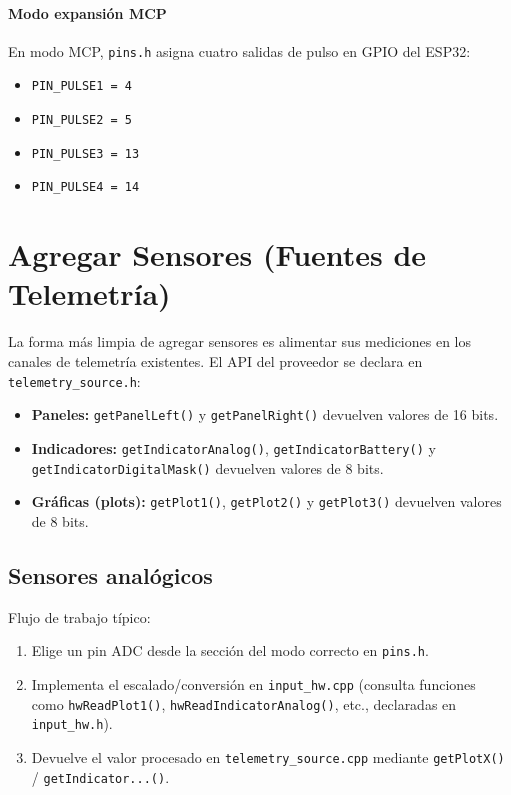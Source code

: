 \paragraph{Modo expansión MCP}
En modo MCP, \texttt{pins.h} asigna cuatro salidas de pulso en GPIO del ESP32:

\begin{itemize}
    \item \texttt{PIN\_PULSE1 = 4}
    \item \texttt{PIN\_PULSE2 = 5}
    \item \texttt{PIN\_PULSE3 = 13}
    \item \texttt{PIN\_PULSE4 = 14}
\end{itemize}

\section{Agregar Sensores (Fuentes de Telemetría)}

La forma más limpia de agregar sensores es alimentar sus mediciones en los canales de telemetría existentes. El API del proveedor
se declara en \texttt{telemetry\_source.h}:

\begin{itemize}
    \item \textbf{Paneles:} \verb|getPanelLeft()| y \verb|getPanelRight()| devuelven valores de 16 bits.
    \item \textbf{Indicadores:} \verb|getIndicatorAnalog()|, \verb|getIndicatorBattery()| y
    \verb|getIndicatorDigitalMask()| devuelven valores de 8 bits.
    \item \textbf{Gráficas (plots):} \verb|getPlot1()|, \verb|getPlot2()| y \verb|getPlot3()| devuelven valores de 8 bits.
\end{itemize}

\subsection{Sensores analógicos}
Flujo de trabajo típico:
\begin{enumerate}
    \item Elige un pin ADC desde la sección del modo correcto en \texttt{pins.h}.
    \item Implementa el escalado/conversión en \texttt{input\_hw.cpp} (consulta funciones como \verb|hwReadPlot1()|,
    \verb|hwReadIndicatorAnalog()|, etc., declaradas en \texttt{input\_hw.h}).
    \item Devuelve el valor procesado en \texttt{telemetry\_source.cpp} mediante \verb|getPlotX()| / \verb|getIndicator...()|.
\end{enumerate}

